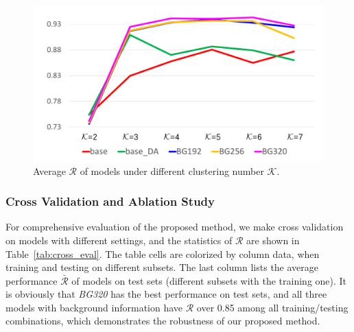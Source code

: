 \documentclass[letterpaper, 10 pt, conference]{ieeeconf}  %
\begin{document}
\begin{figure}[]
	\centering
	\includegraphics[scale=0.25]{kmeans_exp.pdf}
	\caption{Average $\mathcal{R}$ of models under different clustering number $\mathcal{K}$.}
	\label{fig:kmeans_exp}
\end{figure}

\subsubsection{Cross Validation and Ablation Study}

%
%
For comprehensive evaluation of the proposed method, we make cross validation on models with different settings, and the statistics of $\mathcal{R}$ are shown in Table~\ref{tab:cross_eval}. The table cells are colorized by column data, when training and testing on different subsets. The last column lists the average performance $\bar{\mathcal{R}}$ of models on test sets (different subsets with the training one). It is obviously that \textit{BG320} has the best performance on test sets, and all three models with background information have $\mathcal{R}$ over 0.85 among all training/testing combinations, which demonstrates the robustness of our proposed method.
\end{document}
